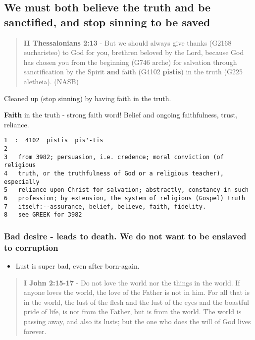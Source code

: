 \documentclass[11pt]{article}
\begin{document}
\subsection{We must \textbf{both} believe the truth and be sanctified, \textbf{and} stop sinning to be saved}
\label{sec:org3854b72}
\begin{quote}
\textbf{II Thessalonians 2:13} - But we should always give thanks (G2168 eucharisteo) to God for you, brethren beloved by the Lord, because God has chosen you from the beginning (G746 arche) for salvation through sanctification by the Spirit \textbf{and} faith (G4102 \textbf{pistis}) in the truth (G225 aletheia). (NASB)
\end{quote}

Cleaned up (stop sinning) by having faith in the truth.

\textbf{Faith} in the truth - strong faith word! Belief and ongoing faithfulness, trust, reliance.

\begin{verbatim}
1  :  4102  pistis  pis'-tis
2  
3   from 3982; persuasion, i.e. credence; moral conviction (of religious
4   truth, or the truthfulness of God or a religious teacher), especially
5   reliance upon Christ for salvation; abstractly, constancy in such
6   profession; by extension, the system of religious (Gospel) truth
7   itself:--assurance, belief, believe, faith, fidelity.
8   see GREEK for 3982
\end{verbatim}

\subsubsection{Bad desire - leads to death. We do not want to be enslaved to corruption}
\label{sec:org26de06a}
\begin{itemize}
\item Lust is super bad, even after born-again.
\end{itemize}

\begin{quote}
\textbf{I John 2:15-17} - Do not love the world nor the things in the world. If anyone loves the world, the love of the Father is not in him. For all that is in the world, the lust of the flesh and the lust of the eyes and the boastful pride of life, is not from the Father, but is from the world. The world is passing away, and also its lusts; but the one who does the will of God lives forever.
\end{quote}
\end{document}
